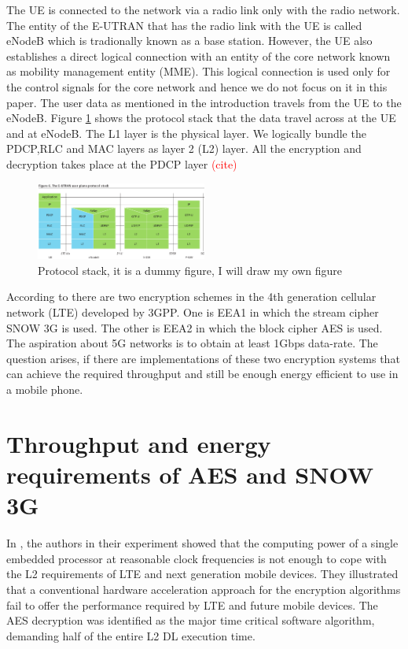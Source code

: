 The UE is connected to the network via a radio link only with the radio network. The entity of the E-UTRAN that has the radio link with the UE is called eNodeB which is tradionally known as a base station. However, the UE also establishes a direct logical connection with an entity of the core network known as mobility management entity (MME). This logical connection is used only for the control signals for the core network and hence we do not focus on it in this paper. The user data as mentioned in the introduction travels from the UE to the eNodeB. Figure \ref{fig:protocl_stack} shows the protocol stack that the data travel across at the UE and at eNodeB. The L1 layer is the physical layer. We logically bundle the PDCP,RLC and MAC layers as layer 2 (L2) layer. All the encryption and decryption takes place at the PDCP layer \textcolor{red}{(cite)}

\begin{figure}
  \includegraphics[width=0.50\textwidth]{protocl_stack.png}
\caption{Protocol stack, it is a dummy figure, I will draw my own figure}
\label{fig:protocl_stack}       %
\end{figure}

According to %
there are two encryption schemes in the 4th generation cellular network (LTE) developed by 3GPP. One is EEA1 in which the stream cipher SNOW 3G is used. The other is EEA2 in which the block cipher AES is used. The aspiration about 5G networks is to obtain at least 1Gbps data-rate. The question arises, if there are implementations of these two encryption systems that can achieve the required throughput and still be enough energy efficient to use in a mobile phone.

\section{Throughput and energy requirements of AES and SNOW 3G}
\label{sec:throughput_and_energy_requirements_of_aes_snow3g}
In \cite{IIS_Ruhr_2009}, the authors in their experiment showed that the computing power of a single embedded processor at reasonable clock frequencies is not enough to cope with the L2 requirements of LTE and next generation mobile devices. They illustrated that a conventional hardware acceleration approach for the encryption algorithms fail to offer the performance required by LTE and future mobile devices. The AES decryption was identified as the major time critical software algorithm, demanding half of the entire L2 DL execution time.


